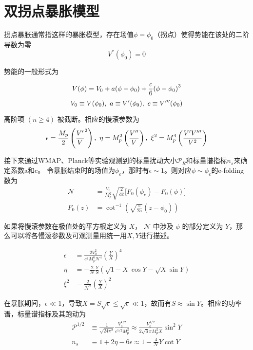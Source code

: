 \section{双拐点暴胀模型}
拐点暴胀通常指这样的暴胀模型，存在场值$\phi=\phi_0$（拐点）使得势能在该处的二阶导数为零
\begin{equation}
    V^{\dprime}(\phi_0) = 0
\end{equation}

势能的一般形式为

\begin{equation}
    \label{eq:inf_potential}
    V (\phi)=V_0+a (\phi-\phi_0)+\frac{c}{6}{\left(\phi-\phi_0\right)}^3\\
\end{equation}
\begin{equation}
    V_0\equiv V (\phi_0),\ a\equiv V' (\phi_0),\ c\equiv V^{\tprime} (\phi_0) 
\end{equation}

高阶项 $(n \geq 4)$ 被截断。相应的慢滚参数为
\begin{equation}
    \label{eq:psrp}
    \epsilon = \frac{M_p}{2}\left(\frac{V'}{V}^2\right),\ \eta=M^2_p
    \left(\frac{V^{\dprime}}{V}\right),\ \xi^2=M^4_p\left(\frac{V'V^{\tprime}}{V^2}\right)
\end{equation}

接下来通过WMAP、Planck等实验观测到的标量扰动大小$\mathcal{P}_R$和标量谱指标$n_s$来确定系数a和c。
令暴胀结束时的场值为$\phi_e$，那时有$\epsilon\sim
1$。则对应$\phi\sim\phi_e$的e-folding数为
\begin{align}
    \label{eq:e-folding}
    \mathcal{N} &= \frac{V_0}{M^2_p}\sqrt{\frac{2}{ac}}\lbrack
    F_0(\phi_e)-F_0(\phi)\rbrack \\
    F_0(z) &= \cot^{-1}\left(\sqrt{\frac{c}{2a}}(z-\phi_0)\right)
\end{align}

如果将慢滚参数在极值处的平方根定义为 $X$， $\mathcal{N}$ 中涉及 $\phi$
的部分定义为 $Y$，那么可以将各慢滚参数及可观测量用统一用$X,Y$进行描述。

\begin{align}
    \epsilon &=
    \frac{2V_0^2}{c^2M_p^6\mathcal{N}^4} {\left(\frac{Y}{X} \right)}^4 \\
    \eta &=
    -\frac{2}{\mathcal{N}}\frac{Y}{S}\left(\sqrt{1-X}\cos Y-\sqrt{X}\sin
    Y\right)\\
    \xi^2 &= \frac{2}{\mathcal{N}^2}{\left(\frac{Y}{X}\right)}^2
\end{align}

在暴胀期间，$\epsilon \ll 1$，导致$X=S\sqrt{\epsilon}\leq\sqrt{\epsilon}\ll
1$，故而有$S\approx \sin Y$。相应的功率谱，标量谱指标及其跑动为
\begin{align}
    \mathcal{P}^{1/2}&\equiv\frac{1}{\sqrt{24\pi^2}}\frac{V_0^{1/2}}{\epsilon^{1/2}M_p^2}
    \approx\frac{V_0^{1/2}}{2\sqrt{6}\pi M_p^2 X}\sin^2Y\\
    n_s&\equiv1+2\eta-6\epsilon\approx1-\frac{4}{\mathcal{N}}Y\cot Y\\
\end{align}
